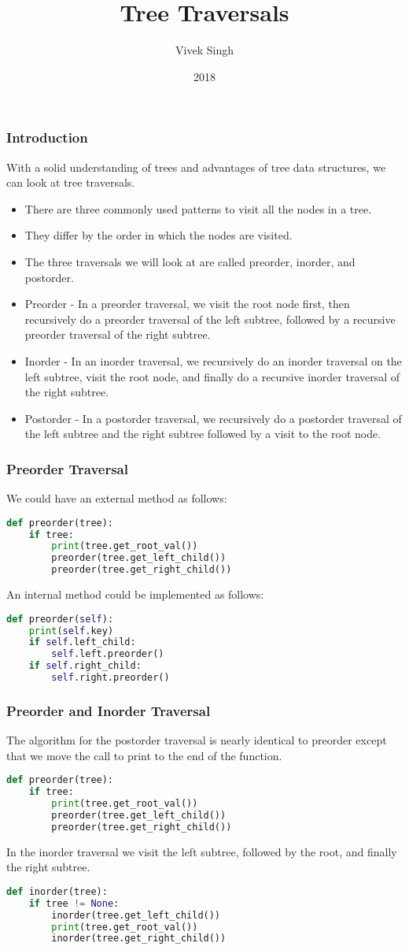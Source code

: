 \documentclass{beamer}
\title{Tree Traversals}
\author{Vivek Singh}
\institute{Information Systems Decision Sciences (ISDS)\\
MUMA College of Business\\
University of South Florida \\
Tampa, Florida}
\date{2018}
\begin{document}
\frame{\titlepage}
\begin{frame}
\frametitle{Introduction}
With a solid understanding of trees and advantages of tree data structures, we can look at tree traversals.
\begin{itemize}
\item There are three commonly used patterns to visit all the nodes in a tree.
\item They differ by the order in which the nodes are visited.
\item The three traversals we will look at
are called preorder, inorder, and postorder.
\item Preorder - In a preorder traversal, we visit the root node first, then recursively do a preorder traversal of the left subtree, followed by a recursive preorder traversal of the right subtree.
\item Inorder - In an inorder traversal, we recursively do an inorder traversal on the left subtree, visit the root node, and finally do a recursive inorder traversal of the right subtree.
\item Postorder - In a postorder traversal, we recursively do a postorder traversal of the left subtree and the right subtree followed by a visit to the root node.
\end{itemize}
\end{frame}

\begin{frame}[fragile]
\frametitle{Preorder Traversal}
We could have an external method as follows:
\begin{lstlisting}[language=Python]
def preorder(tree):
    if tree:
        print(tree.get_root_val())
        preorder(tree.get_left_child())
        preorder(tree.get_right_child())
\end{lstlisting}

An internal method could be implemented as follows:
\begin{lstlisting}[language=Python]
def preorder(self):
    print(self.key)
    if self.left_child:
        self.left.preorder()
    if self.right_child:
        self.right.preorder()
\end{lstlisting}
\end{frame}

\begin{frame}[fragile]
\frametitle{Preorder and Inorder Traversal}
The algorithm for the postorder traversal is nearly identical to preorder except that we move the call to print to the end of the function.
\begin{lstlisting}[language=Python]
def preorder(tree):
    if tree:
        print(tree.get_root_val())
        preorder(tree.get_left_child())
        preorder(tree.get_right_child())
\end{lstlisting}

In the inorder traversal we visit the left subtree, followed by the root, and finally the right subtree.
\begin{lstlisting}[language=Python]
def inorder(tree):
    if tree != None:
        inorder(tree.get_left_child())
        print(tree.get_root_val())
        inorder(tree.get_right_child())
\end{lstlisting}
\end{frame}
\end{document}
